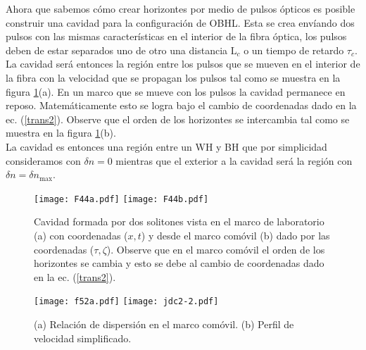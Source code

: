 Ahora que sabemos c\'{o}mo crear horizontes por medio de pulsos \'{o}pticos es posible construir una cavidad para la configuraci\'{o}n de OBHL. Esta se crea env\'iando dos pulsos con las mismas caracter\'{i}sticas en el interior de la fibra \'{o}ptica, los pulsos deben de estar separados uno de otro una distancia $\text{L}_c$ o un tiempo de retardo $\tau_c$. La cavidad ser\'{a} entonces la regi\'{o}n entre los pulsos que se mueven en el interior de la fibra con la velocidad que se propagan los pulsos tal como se muestra en la figura \ref{fig:cavidadlab}(a). En un marco que se mueve con los pulsos la cavidad permanece en reposo. Matem\'{a}ticamente esto se logra bajo el cambio de coordenadas dado en la ec. (\ref{trans2}). Observe que el orden de los horizontes se intercambia tal como se muestra en la figura \ref{fig:cavidadlab}(b).\\

La cavidad es entonces una regi\'{o}n entre un WH y BH que por simplicidad consideramos con $\delta n=0$ mientras que el exterior a la cavidad ser\'{a} la regi\'{o}n con $\delta n=\delta n_{\text{max}}$.

\begin{figure}
   \centering
   \texttt{[image: F44a.pdf]}%
   \hspace{0.1cm}%
   \texttt{[image: F44b.pdf]}%
   \caption{Cavidad formada por dos solitones vista en el marco de laboratorio (a) con coordenadas ($x,t$) y desde el marco com\'{o}vil (b) dado por las coordenadas ($\tau,\zeta$). Observe que en el marco com\'{o}vil el orden de los horizontes se cambia y esto se debe al cambio de coordenadas dado en la ec. (\ref{trans2}).} 
   \label{fig:cavidadlab}
\end{figure}

\begin{figure}
   \centering
   \texttt{[image: f52a.pdf]}%
   \hspace{0.1cm}%
   \texttt{[image: jdc2-2.pdf]}%
   \caption{(a) Relaci\'{o}n de dispersi\'{o}n en el marco com\'{o}vil. (b) Perfil de velocidad simplificado.} 
   \label{fig:ultima}
\end{figure}

